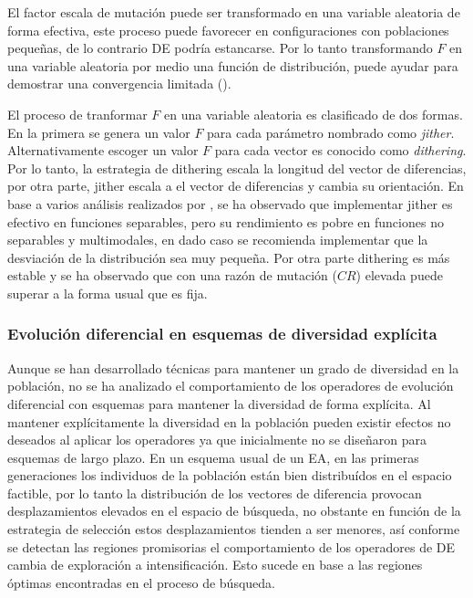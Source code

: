 El factor escala de mutación puede ser transformado en una variable aleatoria de forma efectiva, este proceso puede favorecer en configuraciones con poblaciones pequeñas, de lo contrario DE podría estancarse.
%
Por lo tanto transformando $F$ en una variable aleatoria por medio una función de distribución, puede ayudar para demostrar una convergencia limitada (\cite{zaharie2002critical}).
%

El proceso de tranformar $F$ en una variable aleatoria es clasificado de dos formas.
%
En la primera se genera un valor $F$ para cada parámetro nombrado como \textit{jither}.
%
Alternativamente escoger un valor $F$ para cada vector  es conocido como \textit{dithering}.
%
Por lo tanto, la estrategia de dithering escala la longitud del vector de diferencias, por otra parte, jither escala a el vector de diferencias y cambia su orientación.
%
En base a varios análisis realizados por \cite{price2006differential}, se ha observado que implementar jither es efectivo en funciones separables, pero su rendimiento es pobre en funciones no separables y multimodales, en dado caso se recomienda implementar que la desviación de la distribución sea muy pequeña.
%
Por otra parte dithering es más estable y se ha observado que con una razón de mutación ($CR$) elevada puede superar a la forma usual que es fija.
%

\subsubsection*{Evolución diferencial en esquemas de diversidad explícita}

Aunque se han desarrollado técnicas para mantener un grado de diversidad en la población, no se ha analizado el comportamiento de los operadores de evolución diferencial con esquemas para mantener la diversidad de forma explícita.
%
Al mantener explícitamente la diversidad en la población pueden existir efectos no deseados al aplicar los operadores ya que inicialmente no se diseñaron para esquemas de largo plazo.
%
En un esquema usual de un EA, en las primeras generaciones los individuos de la población están bien distribuídos en el espacio factible, por lo tanto la distribución de los vectores de diferencia provocan desplazamientos elevados en el espacio de búsqueda, no obstante en función de la estrategia de selección estos desplazamientos tienden a ser menores, así conforme se detectan las regiones promisorias el comportamiento de los operadores de DE cambia de exploración a intensificación.
%
Esto sucede en base a las regiones óptimas encontradas en el proceso de búsqueda.

